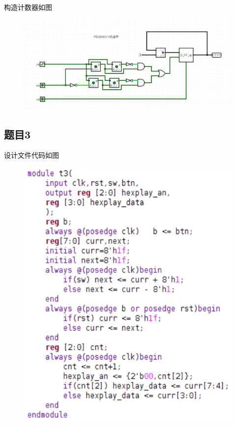 \documentclass{article}
\begin{document}
		\clearpage
		构造计数器如图
		\begin{figure}[htbp]
			\centering
			\includegraphics[scale=0.5]{2l.png}
		\end{figure}

    \subsection*{题目3}
		设计文件代码如图
		\begin{figure}[htbp]
			\centering
			\includegraphics[scale=1]{3v.png}
		\end{figure}
\end{document}
